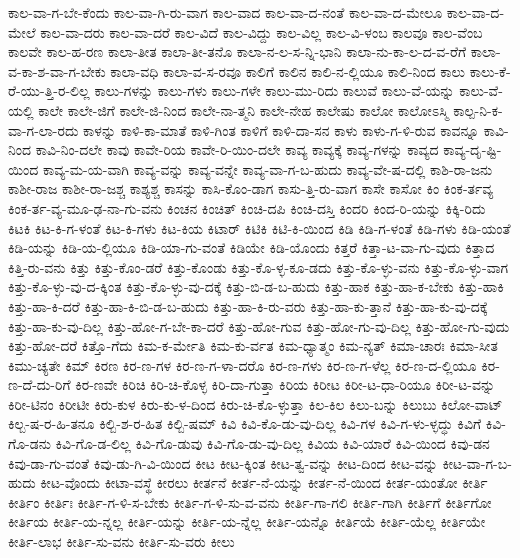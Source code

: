 {ಕಾಲ-ವಾ-ಗ-ಬೇ-ಕೆಂದು
ಕಾಲ-ವಾ-ಗಿ-ರು-ವಾಗ
ಕಾಲ-ವಾದ
ಕಾಲ-ವಾ-ದ-ನಂತೆ
ಕಾಲ-ವಾ-ದ-ಮೇಲೂ
ಕಾಲ-ವಾ-ದ-ಮೇಲೆ
ಕಾಲ-ವಾ-ದರು
ಕಾಲ-ವಾ-ದರೆ
ಕಾಲ-ವಿದೆ
ಕಾಲ-ವಿದ್ದು
ಕಾಲ-ವಿಲ್ಲ
ಕಾಲ-ವಿ-ಳಂಬ
ಕಾಲವೂ
ಕಾಲ-ವೆಂಬ
ಕಾಲವೇ
ಕಾಲ-ಹ-ರಣ
ಕಾಲಾ-ತೀತ
ಕಾಲಾ-ತೀ-ತನೊ
ಕಾಲಾ-ನ-ಲ-ಸ-ನ್ನಿ-ಭಾನಿ
ಕಾಲಾ-ನು-ಕಾ-ಲ-ದ-ವ-ರೆಗೆ
ಕಾಲಾ-ವ-ಕಾ-ಶ-ವಾ-ಗ-ಬೇಕು
ಕಾಲಾ-ವಧಿ
ಕಾಲಾ-ವ-ಸ-ರವೂ
ಕಾಲಿಗೆ
ಕಾಲಿನ
ಕಾಲಿ-ನ-ಲ್ಲಿಯೂ
ಕಾಲಿ-ನಿಂದ
ಕಾಲು
ಕಾಲು-ಕೆ-ರೆ-ಯು-ತ್ತಿ-ರ-ಲಿಲ್ಲ
ಕಾಲು-ಗಳನ್ನು
ಕಾಲು-ಗಳು
ಕಾಲು-ಗಳೇ
ಕಾಲು-ಮು-ರಿದು
ಕಾಲುವೆ
ಕಾಲು-ವೆ-ಯನ್ನು
ಕಾಲು-ವೆ-ಯಲ್ಲಿ
ಕಾಲೇ
ಕಾಲೇ-ಜಿಗೆ
ಕಾಲೇ-ಜಿ-ನಿಂದ
ಕಾಲೇ-ನಾ-ತ್ಮನಿ
ಕಾಲೇ-ನೇಹ
ಕಾಲೇಷು
ಕಾಲೋ
ಕಾಲೋಽಸ್ಮಿ
ಕಾಲ್ಪ-ನಿ-ಕ-ವಾ-ಗ-ಲಾ-ರದು
ಕಾಳನ್ನು
ಕಾಳಿ-ಕಾ-ಮಾತೆ
ಕಾಳಿ-ಗಿಂತ
ಕಾಳಿಗೆ
ಕಾಳಿ-ದಾ-ಸನ
ಕಾಳು
ಕಾಳು-ಗ-ಳಿ-ರುವ
ಕಾವನ್ನೂ
ಕಾವಿ-ನಿಂದ
ಕಾವಿ-ನಿಂ-ದಲೇ
ಕಾವು
ಕಾವೇ-ರಿಯ
ಕಾವೇ-ರಿ-ಯಿಂ-ದಲೇ
ಕಾವ್ಯ
ಕಾವ್ಯಕ್ಕೆ
ಕಾವ್ಯ-ಗಳನ್ನು
ಕಾವ್ಯದ
ಕಾವ್ಯ-ದೃ-ಷ್ಟಿ-ಯಿಂದ
ಕಾವ್ಯ-ಮ-ಯ-ವಾಗಿ
ಕಾವ್ಯ-ವನ್ನು
ಕಾವ್ಯ-ವನ್ನೇ
ಕಾವ್ಯ-ವಾ-ಗ-ಬ-ಹುದು
ಕಾವ್ಯ-ವೇ-ಷ-ದಲ್ಲಿ
ಕಾಶಿ-ರಾ-ಜನು
ಕಾಶೀ-ರಾಜ
ಕಾಶೀ-ರಾ-ಜಶ್ಚ
ಕಾಶ್ಯಶ್ಚ
ಕಾಸನ್ನು
ಕಾಸಿ-ಕೊಂ-ಡಾಗ
ಕಾಸು-ತ್ತಿ-ರು-ವಾಗ
ಕಾಸೇ
ಕಾಸೋ
ಕಿಂ
ಕಿಂಕ-ರ್ತವ್ಯ
ಕಿಂಕ-ರ್ತ-ವ್ಯ-ಮೂ-ಢ-ನಾ-ಗು-ವನು
ಕಿಂಚನ
ಕಿಂಚಿತ್
ಕಿಂಚಿ-ದಪಿ
ಕಿಂಚಿ-ದಸ್ತಿ
ಕಿಂದರಿ
ಕಿಂದ-ರಿ-ಯನ್ನು
ಕಿಕ್ಕಿ-ರಿದು
ಕಿಟಕಿ
ಕಿಟ-ಕಿ-ಗ-ಳಂತೆ
ಕಿಟ-ಕಿ-ಗಳು
ಕಿಟ-ಕಿಯ
ಕಿಟಾರ್
ಕಿಟಿಕಿ
ಕಿಟಿ-ಕಿ-ಯಿಂದ
ಕಿಡಿ
ಕಿಡಿ-ಗ-ಳಂತೆ
ಕಿಡಿ-ಗಳು
ಕಿಡಿ-ಯಂತೆ
ಕಿಡಿ-ಯನ್ನು
ಕಿಡಿ-ಯ-ಲ್ಲಿಯೂ
ಕಿಡಿ-ಯಾ-ಗು-ವಂತೆ
ಕಿಡಿಯೇ
ಕಿಡಿ-ಯೊಂದು
ಕಿತ್ತರೆ
ಕಿತ್ತಾ-ಟ-ವಾ-ಗು-ವುದು
ಕಿತ್ತಾದ
ಕಿತ್ತಿ-ರು-ವನು
ಕಿತ್ತು
ಕಿತ್ತು-ಕೊಂ-ಡರೆ
ಕಿತ್ತು-ಕೊಂಡು
ಕಿತ್ತು-ಕೊ-ಳ್ಳ-ಕೂ-ಡದು
ಕಿತ್ತು-ಕೊ-ಳ್ಳು-ವನು
ಕಿತ್ತು-ಕೊ-ಳ್ಳು-ವಾಗ
ಕಿತ್ತು-ಕೊ-ಳ್ಳು-ವು-ದ-ಕ್ಕಿಂತ
ಕಿತ್ತು-ಕೊ-ಳ್ಳು-ವು-ದಕ್ಕೆ
ಕಿತ್ತು-ಬಿ-ಡ-ಬ-ಹುದು
ಕಿತ್ತು-ಹಾಕ
ಕಿತ್ತು-ಹಾ-ಕ-ಬೇಕು
ಕಿತ್ತು-ಹಾಕಿ
ಕಿತ್ತು-ಹಾ-ಕಿ-ದರೆ
ಕಿತ್ತು-ಹಾ-ಕಿ-ಬಿ-ಡ-ಬ-ಹುದು
ಕಿತ್ತು-ಹಾ-ಕಿ-ರು-ವರು
ಕಿತ್ತು-ಹಾ-ಕು-ತ್ತಾನೆ
ಕಿತ್ತು-ಹಾ-ಕು-ವು-ದಕ್ಕೆ
ಕಿತ್ತು-ಹಾ-ಕು-ವು-ದಿಲ್ಲ
ಕಿತ್ತು-ಹೋ-ಗ-ಬೇ-ಕಾ-ದರೆ
ಕಿತ್ತು-ಹೋ-ಗುವ
ಕಿತ್ತು-ಹೋ-ಗು-ವು-ದಿಲ್ಲ
ಕಿತ್ತು-ಹೋ-ಗು-ವುದು
ಕಿತ್ತು-ಹೋ-ದರೆ
ಕಿತ್ತೊ-ಗೆದು
ಕಿಮ-ಕ-ರ್ಮೇತಿ
ಕಿಮ-ಕು-ರ್ವತ
ಕಿಮ-ಧ್ಯಾತ್ಮಂ
ಕಿಮ-ನ್ಯತ್
ಕಿಮಾ-ಚಾರಃ
ಕಿಮಾ-ಸೀತ
ಕಿಮು-ಚ್ಯತೇ
ಕಿಮ್
ಕಿರಣ
ಕಿರ-ಣ-ಗಳ
ಕಿರ-ಣ-ಗ-ಳಾ-ದರೊ
ಕಿರ-ಣ-ಗಳು
ಕಿರ-ಣ-ಗ-ಳೆಲ್ಲ
ಕಿರ-ಣ-ದ-ಲ್ಲಿಯೂ
ಕಿರ-ಣ-ದೆ-ದು-ರಿಗೆ
ಕಿರ-ಣವೇ
ಕಿರಿಚಿ
ಕಿರಿ-ಚಿ-ಕೊಳ್ಳ
ಕಿರಿ-ದಾ-ಗುತ್ತಾ
ಕಿರಿಯ
ಕಿರೀಟ
ಕಿರೀ-ಟ-ಧಾ-ರಿಯೂ
ಕಿರೀ-ಟ-ವನ್ನು
ಕಿರೀ-ಟಿನಂ
ಕಿರೀಟೀ
ಕಿರು-ಕುಳ
ಕಿರು-ಕು-ಳ-ದಿಂದ
ಕಿರು-ಚಿ-ಕೊ-ಳ್ಳುತ್ತಾ
ಕಿಲ-ಕಿಲ
ಕಿಲು-ಬನ್ನು
ಕಿಲುಬು
ಕಿಲೋ-ವಾಟ್
ಕಿಲ್ಬ-ಷ-ರ-ಹಿ-ತನೂ
ಕಿಲ್ಬಿ-ಶ-ರ-ಹಿತ
ಕಿಲ್ಬಿ-ಷಮ್
ಕಿವಿ
ಕಿವಿ-ಕೊ-ಡು-ವು-ದಿಲ್ಲ
ಕಿವಿ-ಗಳ
ಕಿವಿ-ಗ-ಳು-ಳ್ಳದ್ಧು
ಕಿವಿಗೆ
ಕಿವಿ-ಗೊ-ಡನು
ಕಿವಿ-ಗೊ-ಡ-ಲಿಲ್ಲ
ಕಿವಿ-ಗೊ-ಡುವು
ಕಿವಿ-ಗೊ-ಡು-ವು-ದಿಲ್ಲ
ಕಿವಿಯ
ಕಿವಿ-ಯಾರೆ
ಕಿವಿ-ಯಿಂದ
ಕಿವು-ಡನ
ಕಿವು-ಡಾ-ಗು-ವಂತೆ
ಕಿವು-ಡು-ಗಿ-ವಿ-ಯಿಂದ
ಕೀಟ
ಕೀಟ-ಕ್ಕಿಂತ
ಕೀಟ-ತ್ವ-ವನ್ನು
ಕೀಟ-ದಿಂದ
ಕೀಟ-ವನ್ನು
ಕೀಟ-ವಾ-ಗ-ಬ-ಹುದು
ಕೀಟ-ವೊಂದು
ಕೀಟಾ-ವಸ್ಥೆ
ಕೀರಲು
ಕೀರ್ತನೆ
ಕೀರ್ತ-ನೆ-ಯನ್ನು
ಕೀರ್ತ-ನೆ-ಯಿಂದ
ಕೀರ್ತ-ಯಂತೋ
ಕೀರ್ತಿ
ಕೀರ್ತಿಂ
ಕೀರ್ತಿಃ
ಕೀರ್ತಿ-ಗ-ಳಿ-ಸ-ಬೇಕು
ಕೀರ್ತಿ-ಗ-ಳಿ-ಸು-ವ-ವನು
ಕೀರ್ತಿ-ಗಾ-ಗಲಿ
ಕೀರ್ತಿ-ಗಾಗಿ
ಕೀರ್ತಿಗೆ
ಕೀರ್ತಿಗೋ
ಕೀರ್ತಿಯ
ಕೀರ್ತಿ-ಯ-ನ್ನಲ್ಲ
ಕೀರ್ತಿ-ಯನ್ನು
ಕೀರ್ತಿ-ಯ-ನ್ನೆಲ್ಲ
ಕೀರ್ತಿ-ಯನ್ನೊ
ಕೀರ್ತಿಯೆ
ಕೀರ್ತಿ-ಯೆಲ್ಲ
ಕೀರ್ತಿಯೇ
ಕೀರ್ತಿ-ಲಾಭ
ಕೀರ್ತಿ-ಸು-ವನು
ಕೀರ್ತಿ-ಸು-ವರು
ಕೀಲು
}
